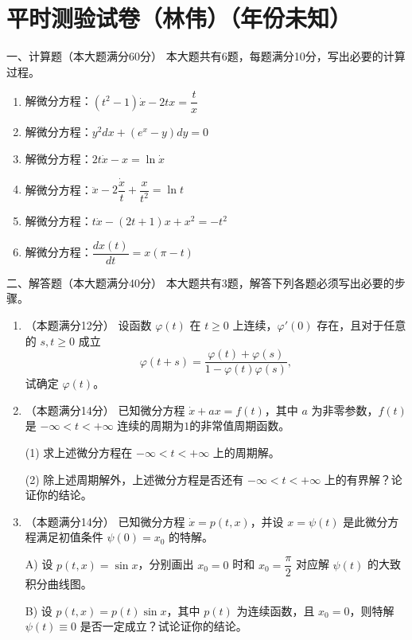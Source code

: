 \section{平时测验试卷（林伟）（年份未知）}

一、计算题（本大题满分60分）
本大题共有6题，每题满分10分，写出必要的计算过程。

\begin{enumerate}
    \item 解微分方程：$(t^2 - 1)\dot{x}- 2tx = \dfrac{t}{x}$
    
    \item 解微分方程：$y^2dx + (e^x - y)dy = 0$

    \item 解微分方程：$2t\dot{x}-x=\ln\dot{x}$
    
    \item 解微分方程：$\ddot{x}-2\dfrac{\dot{x}}{t}+\dfrac{x}{t^2}=\ln t$
    
    \item 解微分方程：$t\dot{x}-(2t+1)x+x^2=-t^2$
    
    \item 解微分方程：$\dfrac{dx(t)}{dt} = x(\pi - t)$
    
\end{enumerate}

二、解答题（本大题满分40分）
本大题共有3题，解答下列各题必须写出必要的步骤。
\begin{enumerate}
\item[7.]（本题满分12分）
设函数 $\varphi(t)$ 在 $t \geq 0$ 上连续，$\varphi'(0)$ 存在，且对于任意的 $s, t \geq 0$ 成立
\[
\varphi(t + s) = \frac{\varphi(t) + \varphi(s)}{1 - \varphi(t)\varphi(s)},
\]
试确定 $\varphi(t)$。

\item[8.]（本题满分14分）
已知微分方程 $\dot{x} + ax = f(t)$，其中 $a$ 为非零参数，$f(t)$ 是 $-\infty < t < +\infty$ 连续的周期为$1$的非常值周期函数。

(1) 求上述微分方程在 $-\infty < t < +\infty$ 上的周期解。

(2) 除上述周期解外，上述微分方程是否还有 $-\infty < t < +\infty$ 上的有界解？论证你的结论。

\item[9.] （本题满分14分）
已知微分方程 $\dot{x} = p(t, x)$，并设 $x = \psi(t)$ 是此微分方程满足初值条件 $\psi(0) = x_0$ 的特解。

A) 设 $p(t, x) = \sin x$，分别画出 $x_0 = 0$ 时和 $x_0 = \dfrac{\pi}{2}$ 对应解 $\psi(t)$ 的大致积分曲线图。

B) 设 $p(t, x) = p(t) \sin x$，其中 $p(t)$ 为连续函数，且 $x_0 = 0$，则特解 $\psi(t) \equiv 0$ 是否一定成立？试论证你的结论。
\end{enumerate}